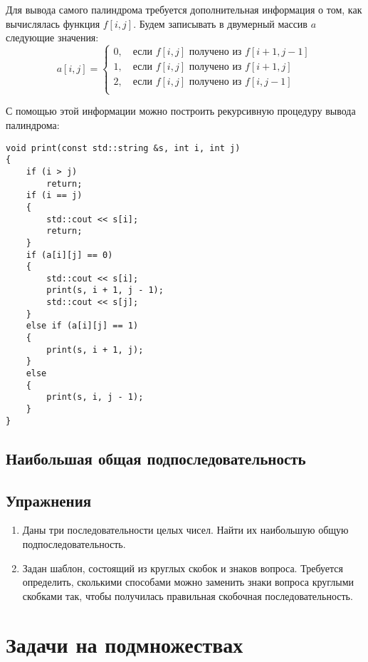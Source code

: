 \documentclass[14pt,openany]{book}
\begin{document}
Для вывода самого палиндрома требуется дополнительная информация о том, как
вычислялась функция $f[i,j]$. Будем записывать в двумерный массив $a$ следующие
значения:
$$
  a[i,j] = \left\{\begin{array}{l}
      0, \quad \text{если $f[i,j]$ получено из $f[i+1,j-1]$} \\
      1, \quad \text{если $f[i,j]$ получено из $f[i+1,j]$} \\
      2, \quad \text{если $f[i,j]$ получено из $f[i,j-1]$} \\
  \end{array}\right.
$$

С помощью этой информации можно построить рекурсивную процедуру вывода
палиндрома:

\begin{lstlisting}
void print(const std::string &s, int i, int j)
{
    if (i > j)
        return;
    if (i == j)
    {
        std::cout << s[i];
        return;
    }
    if (a[i][j] == 0)
    {
        std::cout << s[i];
        print(s, i + 1, j - 1);
        std::cout << s[j];
    }
    else if (a[i][j] == 1)
    {
        print(s, i + 1, j);
    }
    else
    {
        print(s, i, j - 1);
    }
}
\end{lstlisting}

\section{Наибольшая общая подпоследовательность}

\section{Упражнения}

\begin{enumerate}

\item Даны три последовательности целых чисел. Найти их наибольшую общую подпоследовательность.

\item Задан шаблон, состоящий из круглых скобок и знаков вопроса. Требуется определить, сколькими
      способами можно заменить знаки вопроса круглыми скобками так, чтобы получилась правильная
      скобочная последовательность.

\end{enumerate}

\chapter{Задачи на подмножествах}
\end{document}
